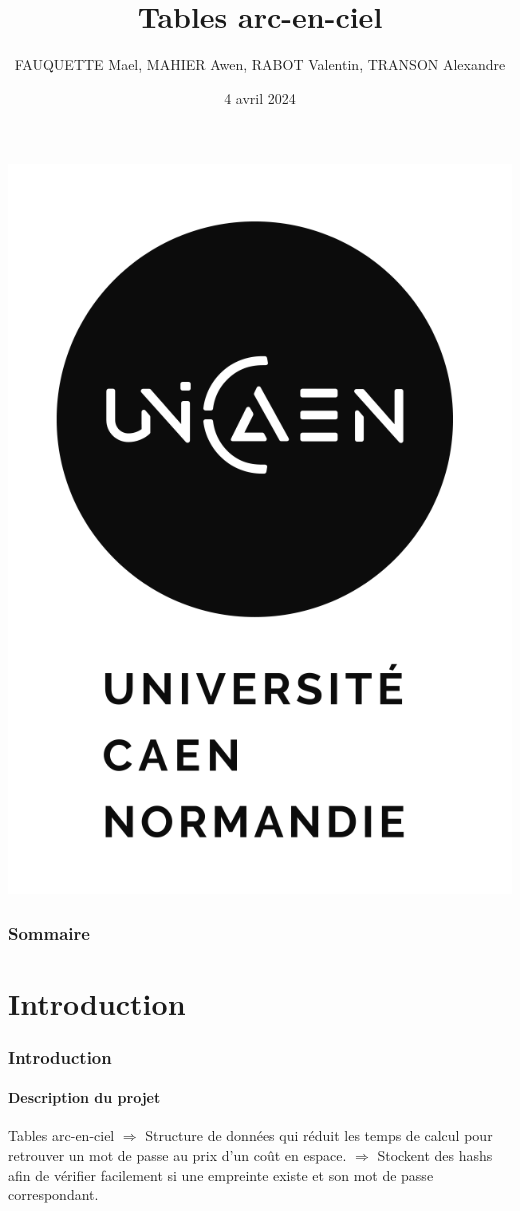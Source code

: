 \documentclass{beamer}
\title{\textbf{Tables arc-en-ciel}}
\author{FAUQUETTE Mael, MAHIER Awen, RABOT Valentin, TRANSON Alexandre}
\institute{L3 Informatique Groupe 3A}
\date{4 avril 2024}
\begin{document}
\begin{frame}
\titlepage
\centering
\includegraphics[scale=0.3]{img/LogoUniCaen.png}
\end{frame}

\begin{frame}
\frametitle{Sommaire}
\tableofcontents
\end{frame}

\section{Introduction}
\begin{frame}
\frametitle{Introduction}
\framesubtitle {Description du projet}
\begin{block}{Tables arc-en-ciel}
$\Rightarrow$ Structure de données qui réduit les temps de calcul pour retrouver un mot de passe au prix d'un coût en espace.\newline 
$\Rightarrow$ Stockent des hashs afin de vérifier facilement si une empreinte existe et son mot de passe correspondant.
\end{block}
\end{frame}
\end{document}
